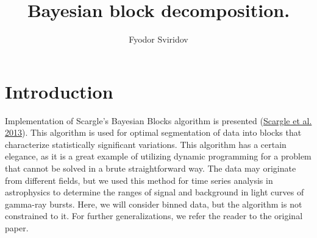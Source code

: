 \documentclass{article}
\title{Bayesian block decomposition.}
\author{Fyodor Sviridov}
\date{}
\begin{document}
\maketitle


\section{Introduction}

Implementation of Scargle's Bayesian Blocks algorithm is presented (\href{https://ui.adsabs.harvard.edu/abs/2013ApJ...764..167S/abstract}{Scargle et al. 2013}). This algorithm is used for optimal segmentation of data into blocks that characterize statistically significant variations. This algorithm has a certain elegance, as it is a great example of utilizing dynamic programming for a problem that cannot be solved in a brute straightforward way. The data may originate from different fields, but we used this method for time series analysis in astrophysics to determine the ranges of signal and background in light curves of gamma-ray bursts. Here, we will consider binned data, but the algorithm is not constrained to it. For further generalizations, we refer the reader to the original paper. 
\end{document}
